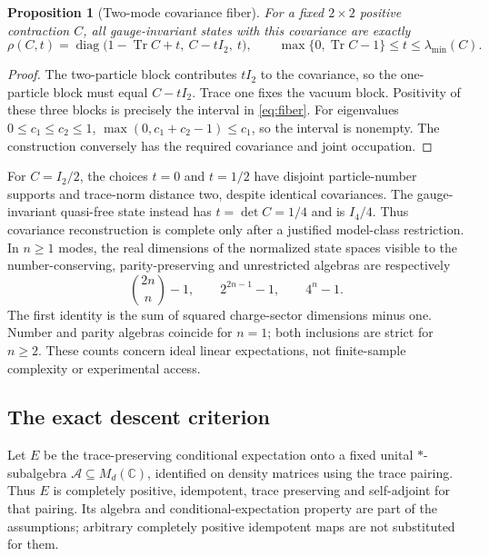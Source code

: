 \documentclass[11pt]{article}
\newcommand{\Tr}{\operatorname{Tr}}
\newtheorem{proposition}[theorem]{Proposition}
\theoremstyle{definition}
\begin{document}
\begin{proposition}[Two-mode covariance fiber]
\label{prop:fiber}
For a fixed $2\times2$ positive contraction $C$, all gauge-invariant states
with this covariance are exactly
\begin{equation}
\rho(C,t)=\operatorname{diag}
\bigl(1-\Tr C+t,\ C-tI_2,\ t\bigr),
\qquad
\max\{0,\Tr C-1\}\le t\le\lambda_{\min}(C).
\label{eq:fiber}
\end{equation}
\end{proposition}
\begin{proof}
The two-particle block contributes $tI_2$ to the covariance, so the
one-particle block must equal $C-tI_2$. Trace one fixes the vacuum block.
Positivity of these three blocks is precisely the interval in
\eqref{eq:fiber}. For eigenvalues $0\le c_1\le c_2\le1$,
$\max(0,c_1+c_2-1)\le c_1$, so the interval is nonempty. The construction
conversely has the required covariance and joint occupation.
\end{proof}

For $C=I_2/2$, the choices $t=0$ and $t=1/2$ have disjoint particle-number
supports and trace-norm distance two, despite identical covariances. The
gauge-invariant quasi-free state instead has $t=\det C=1/4$ and is $I_4/4$.
Thus covariance reconstruction is complete only after a justified model-class
restriction. In $n\ge1$ modes, the real dimensions of the normalized state spaces
visible to the number-conserving, parity-preserving and unrestricted algebras
are respectively
\[
\binom{2n}{n}-1,\qquad 2^{2n-1}-1,\qquad4^n-1.
\]
The first identity is the sum of squared charge-sector dimensions minus one.
Number and parity algebras coincide for $n=1$; both inclusions are strict for
$n\ge2$. These counts concern ideal linear expectations, not finite-sample
complexity or experimental access.

\subsection{The exact descent criterion}
Let $E$ be the trace-preserving conditional expectation onto a fixed unital
$*$-subalgebra $\mathcal A\subseteq M_d(\mathbb C)$, identified on density
matrices using the trace pairing. Thus $E$ is completely positive, idempotent,
trace preserving and self-adjoint for that pairing. Its algebra and
conditional-expectation property are part of the assumptions; arbitrary
completely positive idempotent maps are not substituted for them.
\end{document}
